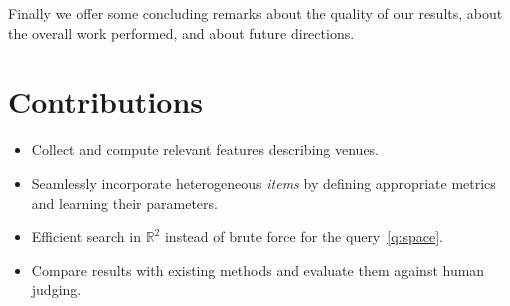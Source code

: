 Finally we offer some concluding remarks about the quality of our results,
about the overall work performed, and about future directions.

\section{Contributions}

\begin{itemize}
	\item Collect and compute relevant features describing venues.
	\item Seamlessly incorporate heterogeneous \emph{items} by defining
		appropriate metrics and learning their parameters.
	\item Efficient search in $\mathbb{R}^2$ instead of brute force for
		the query~\ref{q:space}.
	\item Compare results with existing methods and evaluate them against
		human judging.
\end{itemize}
